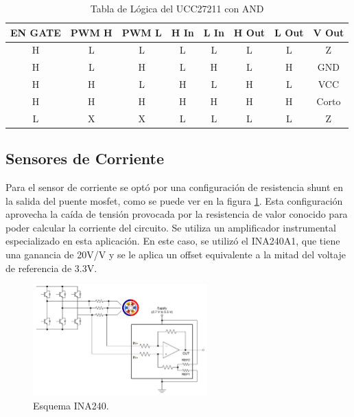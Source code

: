 \documentclass[11pt]{report}
\begin{document}
\begin{table}[ht]
	\centering
	\caption{Tabla de Lógica del UCC27211 con AND}
	\label{UCC27211_logic}
	\begin{tabular}{|c|c|c|c|c|c|c|c|}
		\hline
		\textbf{EN GATE} & \textbf{PWM H} & \textbf{PWM L} & \textbf{H In} & \textbf{L In} & \textbf{H Out} & \textbf{L Out} & \textbf{V Out} \\
		\hline
		H                & L              & L              & L             & L             & L              & L              & Z              \\ \hline
		H                & L              & H              & L             & H             & L              & H              & GND            \\ \hline
		H                & H              & L              & H             & L             & H              & L              & VCC            \\ \hline
		H                & H              & H              & H             & H             & H              & H              & Corto          \\ \hline
		L                & X              & X              & L             & L             & L              & L              & Z              \\ \hline
	\end{tabular}
\end{table}
\FloatBarrier


\newpage
\subsection{Sensores de Corriente}

Para el sensor de corriente se optó por una configuración de resistencia shunt en la salida del puente mosfet, como se puede ver en la figura \ref{INA240}. Esta configuración aprovecha la caída de tensión provocada por la resistencia de valor conocido para poder calcular la corriente del circuito. Se utiliza un amplificador instrumental especializado en esta aplicación. En este caso, se utilizó el INA240A1, que tiene una ganancia de 20V/V y se le aplica un offset equivalente a la mitad del voltaje de referencia de 3.3V.

\begin{figure}[ht]
	\centering
	\includegraphics[width=0.6\textwidth]{imagenes/Diagramas/INA240.png}
	\caption{Esquema INA240.}
	\label{INA240}
\end{figure}
\FloatBarrier
\end{document}
